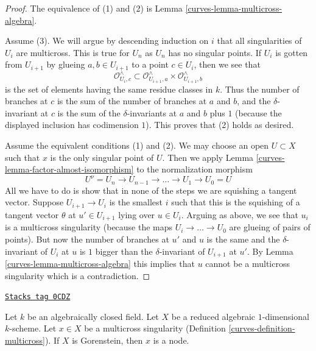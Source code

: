 \begin{proof}

The equivalence of (1) and (2) is Lemma \ref{curves-lemma-multicross-algebra}.

\medskip\noindent
Assume (3). We will argue by descending induction on $i$ that all singularities
of $U_i$ are multicross. This is true for $U_n$ as $U_n$ has no singular points.
If $U_i$ is gotten from $U_{i + 1}$ by glueing $a, b \in U_{i + 1}$
to a point $c \in U_i$, then we see that
$$
\mathcal{O}_{U_i, c}^\wedge \subset
\mathcal{O}_{U_{i + 1}, a}^\wedge \times \mathcal{O}_{U_{i + 1}, b}^\wedge
$$
is the set of elements having the same residue classes in $k$.
Thus the number of branches at $c$ is the sum of the number of
branches at $a$ and $b$, and the $\delta$-invariant at $c$
is the sum of the $\delta$-invariants at $a$ and $b$ plus $1$
(because the displayed inclusion has codimension $1$).
This proves that (2) holds as desired.

\medskip\noindent
Assume the equivalent conditions (1) and (2). We may choose an open
$U \subset X$ such that $x$ is the only singular point of $U$.
Then we apply Lemma \ref{curves-lemma-factor-almost-isomorphism} to
the normalization morphism
$$
U^\nu = U_n \to U_{n - 1} \to \ldots \to U_1 \to U_0 = U
$$
All we have to do is show that in none of the steps we are
squishing a tangent vector. Suppose $U_{i + 1} \to U_i$ is the
smallest $i$ such that this is the squishing of a tangent
vector $\theta$ at $u' \in U_{i + 1}$ lying over $u \in U_i$.
Arguing as above, we see that $u_i$ is a multicross singularity
(because the maps $U_i \to \ldots \to U_0$ are glueing of
pairs of points). But now the number of branches at $u'$ and $u$
is the same and the $\delta$-invariant of $U_i$ at $u$
is $1$ bigger than the $\delta$-invariant of $U_{i + 1}$ at $u'$.
By Lemma \ref{curves-lemma-multicross-algebra}
this implies that $u$ cannot be a multicross singularity which
is a contradiction.
\end{proof}

\begin{lemma}
\label{curves-lemma-multicross-gorenstein-is-nodal}
\href{https://stacks.math.columbia.edu/tag/0CDZ}{\texttt{Stacks tag 0CDZ}}

Let $k$ be an algebraically closed field. Let $X$ be a reduced algebraic
$1$-dimensional $k$-scheme. Let $x \in X$ be a multicross singularity
(Definition \ref{curves-definition-multicross}).
If $X$ is Gorenstein, then $x$ is a node.
\end{lemma}

